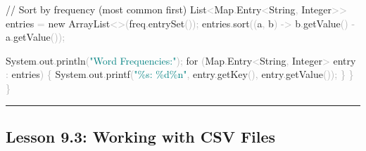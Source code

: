 \documentclass[
  justified,
  openright,
]{tufte-book}
\newcommand{\BuiltInTok}[1]{#1}
\newcommand{\CommentTok}[1]{\textcolor{MidGray}{#1}}
\newcommand{\ControlFlowTok}[1]{\textcolor{BrandBlue}{#1}}
\newcommand{\FunctionTok}[1]{\textcolor{BrandBlue}{#1}}
\newcommand{\KeywordTok}[1]{\textcolor{BrandBlue}{#1}}
\newcommand{\NormalTok}[1]{#1}
\newcommand{\OperatorTok}[1]{\textcolor{DarkGray}{#1}}
\newcommand{\SpecialCharTok}[1]{\textcolor{Teal}{#1}}
\newcommand{\StringTok}[1]{\textcolor{Teal}{#1}}
\newenvironment{Shaded}{%
  \begin{snugshade}
}{%
  \end{snugshade}
}
\begin{document}
\begin{Shaded}
\begin{Highlighting}[]
        \CommentTok{// Sort by frequency (most common first)}
        \BuiltInTok{List}\OperatorTok{\textless{}}\BuiltInTok{Map}\OperatorTok{.}\FunctionTok{Entry}\OperatorTok{\textless{}}\BuiltInTok{String}\OperatorTok{,} \BuiltInTok{Integer}\OperatorTok{\textgreater{}\textgreater{}}\NormalTok{ entries }\OperatorTok{=} \KeywordTok{new} \BuiltInTok{ArrayList}\OperatorTok{\textless{}\textgreater{}(}\NormalTok{freq}\OperatorTok{.}\FunctionTok{entrySet}\OperatorTok{());}
\NormalTok{        entries}\OperatorTok{.}\FunctionTok{sort}\OperatorTok{((}\NormalTok{a}\OperatorTok{,}\NormalTok{ b}\OperatorTok{)} \OperatorTok{{-}\textgreater{}}\NormalTok{ b}\OperatorTok{.}\FunctionTok{getValue}\OperatorTok{()} \OperatorTok{{-}}\NormalTok{ a}\OperatorTok{.}\FunctionTok{getValue}\OperatorTok{());}

        \BuiltInTok{System}\OperatorTok{.}\FunctionTok{out}\OperatorTok{.}\FunctionTok{println}\OperatorTok{(}\StringTok{"Word Frequencies:"}\OperatorTok{);}
        \ControlFlowTok{for} \OperatorTok{(}\BuiltInTok{Map}\OperatorTok{.}\FunctionTok{Entry}\OperatorTok{\textless{}}\BuiltInTok{String}\OperatorTok{,} \BuiltInTok{Integer}\OperatorTok{\textgreater{}}\NormalTok{ entry }\OperatorTok{:}\NormalTok{ entries}\OperatorTok{)} \OperatorTok{\{}
            \BuiltInTok{System}\OperatorTok{.}\FunctionTok{out}\OperatorTok{.}\FunctionTok{printf}\OperatorTok{(}\StringTok{"\textquotesingle{}}\SpecialCharTok{\%s}\StringTok{\textquotesingle{}: }\SpecialCharTok{\%d\%n}\StringTok{"}\OperatorTok{,}\NormalTok{ entry}\OperatorTok{.}\FunctionTok{getKey}\OperatorTok{(),}\NormalTok{ entry}\OperatorTok{.}\FunctionTok{getValue}\OperatorTok{());}
        \OperatorTok{\}}
    \OperatorTok{\}}
\OperatorTok{\}}
\end{Highlighting}
\end{Shaded}

\begin{center}\rule{0.5\linewidth}{0.5pt}\end{center}

\subsection{Lesson 9.3: Working with CSV
Files}\label{lesson-9.3-working-with-csv-files}
\end{document}
